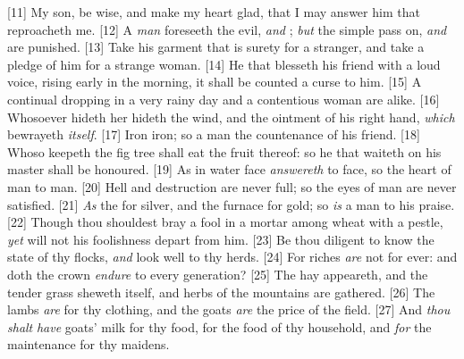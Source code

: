 [11] \textcolor[cmyk]{0.99998,1,0,0}{My son, be wise, and make my heart glad, that I may answer him that reproacheth me.}
[12] \textcolor[cmyk]{0.99998,1,0,0}{A  \emph{man} foreseeth the evil, \emph{and} ; \emph{but} the simple pass on, \emph{and} are punished.}
[13] \textcolor[cmyk]{0.99998,1,0,0}{Take his garment that is surety for a stranger, and take a pledge of him for a strange woman.}
[14] \textcolor[cmyk]{0.99998,1,0,0}{He that blesseth his friend with a loud voice, rising early in the morning, it shall be counted a curse to him.}
[15] \textcolor[cmyk]{0.99998,1,0,0}{A continual dropping in a very rainy day and a contentious woman are alike.}
[16] \textcolor[cmyk]{0.99998,1,0,0}{Whosoever hideth her hideth the wind, and the ointment of his right hand, \emph{which} bewrayeth \emph{itself}.}
[17] \textcolor[cmyk]{0.99998,1,0,0}{Iron  iron; so a man  the countenance of his friend.}
[18] \textcolor[cmyk]{0.99998,1,0,0}{Whoso keepeth the fig tree shall eat the fruit thereof: so he that waiteth on his master shall be honoured.}
[19] \textcolor[cmyk]{0.99998,1,0,0}{As in water face \emph{answereth} to face, so the heart of man to man.}
[20] \textcolor[cmyk]{0.99998,1,0,0}{Hell and destruction are never full; so the eyes of man are never satisfied.}
[21] \textcolor[cmyk]{0.99998,1,0,0}{\emph{As} the  for silver, and the furnace for gold; so \emph{is} a man to his praise.}
[22] \textcolor[cmyk]{0.99998,1,0,0}{Though thou shouldest bray a fool in a mortar among wheat with a pestle, \emph{yet} will not his foolishness depart from him.}
[23] \textcolor[cmyk]{0.99998,1,0,0}{Be thou diligent to know the state of thy flocks, \emph{and} look well to thy herds.}
[24] \textcolor[cmyk]{0.99998,1,0,0}{For riches \emph{are} not for ever: and doth the crown \emph{endure} to every generation?}
[25] \textcolor[cmyk]{0.99998,1,0,0}{The hay appeareth, and the tender grass sheweth itself, and herbs of the mountains are gathered.}
[26] \textcolor[cmyk]{0.99998,1,0,0}{The lambs \emph{are} for thy clothing, and the goats \emph{are} the price of the field.}
[27] \textcolor[cmyk]{0.99998,1,0,0}{And \emph{thou} \emph{shalt} \emph{have} goats' milk  for thy food, for the food of thy household, and \emph{for} the maintenance for thy maidens.}


